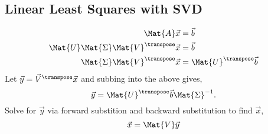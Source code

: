 \subsection{Linear Least Squares with SVD}

\begin{equation}
  \begin{aligned}
    \Mat{A} \Vec{x} &= \Vec{b} \\
    \Mat{U} \Mat{\Sigma} \Mat{V}^{\transpose} \Vec{x} &= \Vec{b} \\
    \Mat{\Sigma} \Mat{V}^{\transpose} \Vec{x} &= \Mat{U}^{\transpose} \Vec{b} \\
  \end{aligned}
\end{equation}
Let $\Vec{y} = \Vec{V}^{\transpose} \Vec{x}$ and subbing into the above gives,
\begin{equation}
  \Vec{y} = \Mat{U}^{\transpose} \Vec{b} \Mat{\Sigma}^{-1}.
\end{equation}
Solve for $\Vec{y}$ via forward substition and backward substitution to find $\Vec{x}$,
\begin{equation}
  \Vec{x} = \Mat{V} \Vec{y}
\end{equation}
